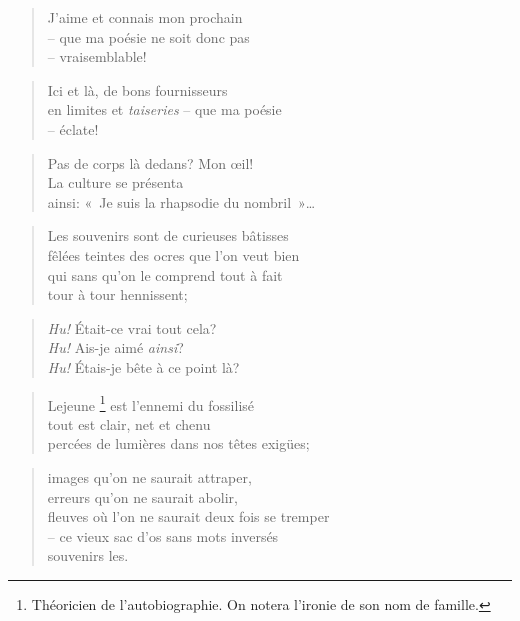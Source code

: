   \begin{verse}
    J’aime et connais mon prochain\\
    -- que ma poésie ne soit donc pas\\
    -- vraisemblable!
  \end{verse}
  \begin{verse}
    Ici et là, de bons fournisseurs\\
    en limites et \emph{taiseries} -- que ma poésie\\
    -- éclate!
  \end{verse}
  \begin{verse}
    Pas de corps là dedans? Mon œil!\\
    La culture se présenta\\
    ainsi: «~Je suis la rhapsodie du nombril~»…
  \end{verse}
  \begin{verse}
    Les souvenirs sont de curieuses bâtisses\\
    fêlées teintes des ocres que l’on veut bien\\
    qui sans qu’on le comprend tout à fait\\
    tour à tour hennissent;
  \end{verse}
  \begin{verse}
    \emph{Hu!} Était-ce vrai tout cela?\\
    \emph{Hu!} Ais-je aimé \emph{ainsi}?\\
    \emph{Hu!} Étais-je bête à ce point là?
  \end{verse}
  \begin{verse}
    Lejeune
    \footnote{
      Théoricien de l’autobiographie. On notera l’ironie de son nom de
      famille.
    } est l’ennemi du fossilisé\\
    tout est clair, net et chenu\\
    percées de lumières dans nos têtes exig\"ues;
  \end{verse}
  \begin{verse}
    images qu’on ne saurait attraper,\\
    erreurs qu’on ne saurait abolir,\\
    fleuves où l’on ne saurait deux fois se tremper\\
    -- ce vieux sac d’os sans mots inversés\\
    souvenirs les.
  \end{verse}
